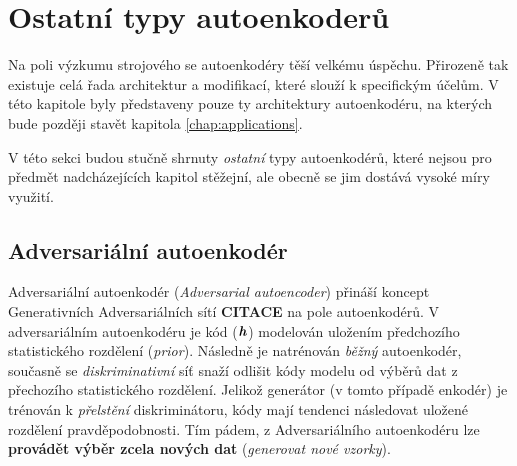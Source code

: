 \section{Ostatní typy autoenkoderů}
Na poli výzkumu strojového se autoenkodéry těší velkému úspěchu. Přirozeně tak existuje celá řada architektur a modifikací, které slouží k specifickým účelům.
V této kapitole byly představeny pouze ty architektury autoenkodéru, na kterých bude později stavět kapitola \autoref{chap:applications}.

V této sekci budou stučně shrnuty \emph{ostatní} typy autoenkodérů, které nejsou pro předmět nadcházejících kapitol stěžejní, ale obecně se jim dostává vysoké míry využití.

\subsection{Adversariální autoenkodér}
Adversariální autoenkodér (\emph{Adversarial autoencoder}) přináší koncept Generativních Adversariálních sítí \textbf{CITACE} na pole autoenkodérů.
V adversariálním autoenkodéru je kód ($\textbf{\emph{h}}$) modelován uložením předchozího statistického rozdělení (\emph{prior}).
Následně je natrénován \emph{běžný} autoenkodér, současně se \emph{diskriminativní} síť snaží odlišit kódy modelu od výběrů dat z přechozího statistického rozdělení.
Jelikož generátor (v tomto případě enkodér) je trénován k \emph{přelstění} diskriminátoru, kódy mají tendenci následovat uložené rozdělení pravděpodobnosti.
Tím pádem, z Adversariálního autoenkodéru lze \textbf{provádět výběr zcela nových dat} (\emph{generovat nové vzorky}).

